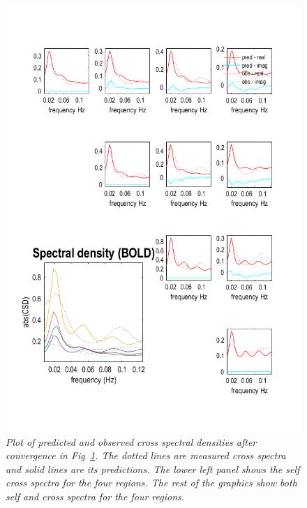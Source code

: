 \begin{figure}[ht]
\begin{center}
\includegraphics[width=140mm]{dcm_rs/Fig2}
\caption{\em Plot of predicted and observed cross spectral densities after convergence in Fig~\ref{spdcm_Fig2}. The dotted lines are measured cross spectra and solid lines are its predictions. The lower left panel shows the self cross spectra for the four regions. The rest of the graphics show both self and cross spectra for the four regions.
\label{spdcm_Fig2}}
\end{center}
\end{figure}

